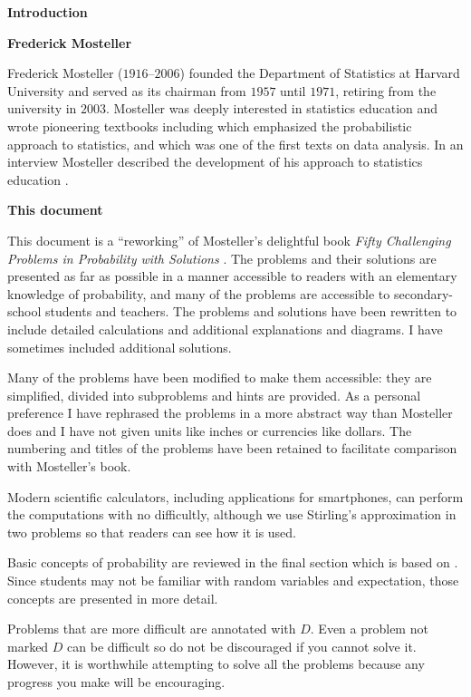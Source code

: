 \begin{center}
\textbf{\LARGE Introduction}
\end{center}


\bigskip

\textbf{Frederick Mosteller}

Frederick Mosteller ($1916$--$2006$) founded the Department of Statistics at Harvard University and served as its chairman from $1957$ until $1971$, retiring from the university in $2003$. Mosteller was deeply interested in statistics education and wrote pioneering textbooks including \cite{pwsa} which emphasized the probabilistic approach to statistics, and \cite{bsda} which was one of the first texts on data analysis. In an interview Mosteller described the development of his approach to statistics education \cite{gse}.

\textbf{This document}

This document is a ``reworking'' of Mosteller's delightful book \textit{Fifty Challenging Problems in Probability with Solutions} \cite{fifty}. The problems and their solutions are presented as far as possible in a manner accessible to readers with an elementary knowledge of probability, and many of the problems are accessible to secondary-school students and teachers. The problems and solutions have been rewritten to include detailed calculations and additional explanations and diagrams. I have sometimes included additional solutions.

Many of the problems have been modified to make them accessible: they are simplified, divided into subproblems and hints are provided. As a personal preference I have rephrased the problems in a more abstract way than Mosteller does and I have not given units like inches or currencies like dollars. The numbering and titles of the problems have been retained to facilitate comparison with Mosteller's book.

Modern scientific calculators, including applications for smartphones, can perform the computations with no difficultly, although we use Stirling's approximation in two problems so that readers can see how it is used.

Basic concepts of probability are reviewed in the final section which is based on \cite{ross}. Since students may not be familiar with random variables and expectation, those concepts are presented in more detail.

Problems that are more difficult are annotated with $D$. Even a problem not marked $D$ can be difficult so do not be discouraged if you cannot solve it. However, it is worthwhile attempting to solve all the problems because any progress you make will be encouraging.

